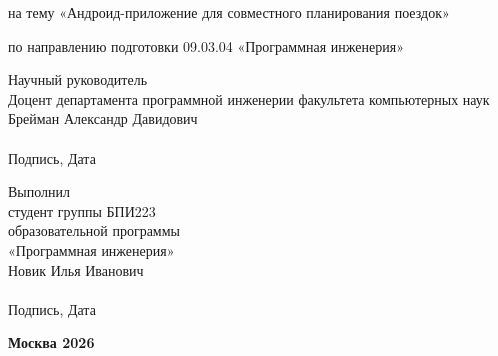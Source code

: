 \begin{titlepage}
    на тему «Андроид-приложение для совместного планирования поездок»

    \vspace{0.6cm}

    по направлению подготовки 09.03.04 «Программная инженерия»

    \vspace{1.0cm}

    \noindent
    \begin{minipage}[t]{0.48\textwidth}
        \raggedright \small
        Научный руководитель \\
        Доцент департамента программной инженерии факультета компьютерных наук \\
        Брейман Александр Давидович \\
        \underline{\hspace{5.2cm}} \\
        Подпись, Дата
    \end{minipage}%
    \hfill
    \begin{minipage}[t]{0.48\textwidth}
        \raggedright \small
        Выполнил \\
        студент группы БПИ223 \\
        образовательной программы \\
        «Программная инженерия» \\
        Новик Илья Иванович \\
        \underline{\hspace{5.2cm}} \\
        Подпись, Дата
    \end{minipage}

    \vfill

    \textbf{Москва 2026}

\end{titlepage}

